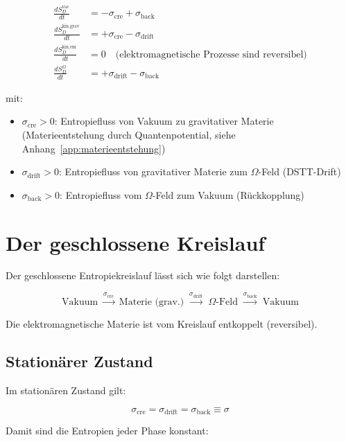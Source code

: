 \[
\begin{aligned}
\frac{dS_D^{\text{vac}}}{dt} &= -\sigma_{\text{cre}} + \sigma_{\text{back}} \\
\frac{dS_D^{\text{kin,grav}}}{dt} &= +\sigma_{\text{cre}} - \sigma_{\text{drift}} \\
\frac{dS_D^{\text{kin,em}}}{dt} &= 0 \quad \text{(elektromagnetische Prozesse sind reversibel)} \\
\frac{dS_D^{\Omega}}{dt} &= +\sigma_{\text{drift}} - \sigma_{\text{back}}
\end{aligned}
\]

mit:

\begin{itemize}
    \item \( \sigma_{\text{cre}} > 0 \): Entropiefluss von Vakuum zu gravitativer Materie (Materieentstehung durch Quantenpotential, siehe Anhang~\ref{app:materieentstehung})
    \item \( \sigma_{\text{drift}} > 0 \): Entropiefluss von gravitativer Materie zum \( \Omega \)-Feld (DSTT-Drift)
    \item \( \sigma_{\text{back}} > 0 \): Entropiefluss vom \( \Omega \)-Feld zum Vakuum (Rückkopplung)
\end{itemize}

\section{Der geschlossene Kreislauf}
\label{sec:entropie_kreislauf}

Der geschlossene Entropiekreislauf lässt sich wie folgt darstellen:

\[
\text{Vakuum} \; \xrightarrow{\sigma_{\text{cre}}} \; \text{Materie (grav.)} \; \xrightarrow{\sigma_{\text{drift}}} \; \Omega\text{-Feld} \; \xrightarrow{\sigma_{\text{back}}} \; \text{Vakuum}
\]

Die elektromagnetische Materie ist vom Kreislauf entkoppelt (reversibel).

\subsection{Stationärer Zustand}
\label{sub:entropie_stationaer}

Im stationären Zustand gilt:

\[
\sigma_{\text{cre}} = \sigma_{\text{drift}} = \sigma_{\text{back}} \equiv \sigma
\]

Damit sind die Entropien jeder Phase konstant:

